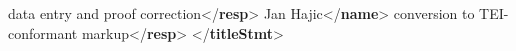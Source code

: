 \begin{shaded}
\hspace*{1em}data entry and proof correction{</\textbf{resp}>}\mbox{}\newline 
{}\mbox{}\newline 
{}\mbox{}\newline 
\hspace*{1em}Jan Hajic{</\textbf{name}>}\mbox{}\newline 
\hspace*{1em}conversion to TEI-conformant markup{</\textbf{resp}>}\mbox{}\newline 
{}\mbox{}\newline 
{</\textbf{titleStmt}>}\end{shaded}\egroup\par 
